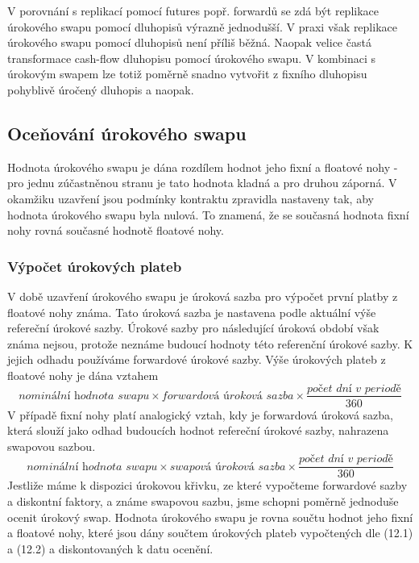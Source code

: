 \documentclass[a4paper]{book}
\begin{document}
V porovnání s replikací pomocí futures popř. forwardů se zdá být replikace úrokového swapu pomocí dluhopisů výrazně jednodušší. V praxi však replikace úrokového swapu pomocí dluhopisů není příliš běžná. Naopak velice častá transformace cash-flow dluhopisu pomocí úrokového swapu. V kombinaci s úrokovým swapem lze totiž poměrně snadno vytvořit z fixního dluhopisu pohyblivě úročený dluhopis a naopak.

\subsection{Oceňování úrokového swapu}

Hodnota úrokového swapu je dána rozdílem hodnot jeho fixní a floatové nohy - pro jednu zúčastněnou stranu je tato hodnota kladná a pro druhou záporná. V okamžiku uzavření jsou podmínky kontraktu zpravidla nastaveny tak, aby hodnota úrokového swapu byla nulová. To znamená, že se současná hodnota fixní nohy rovná současné hodnotě floatové nohy.

\subsubsection{Výpočet úrokových plateb}

V době uzavření úrokového swapu je úroková sazba pro výpočet první platby z floatové nohy známa. Tato úroková sazba je nastavena podle aktuální výše refereční úrokové sazby. Úrokové sazby pro následující úroková období však známa nejsou, protože neznáme budoucí hodnoty této referenční úrokové sazby. K jejich odhadu používáme forwardové úrokové sazby. Výše úrokových plateb z floatové nohy je dána vztahem
\begin{equation}
\textit{nomin\'{a}ln\'i hodnota swapu} \times \textit{forwardov\'{a} \'{u}rokov\'{a} sazba}  \times \frac{\textit{po\v{c}et dn\'{i} v period\v{e}}}{360}
\end{equation}
V případě fixní nohy platí analogický vztah, kdy je forwardová úroková sazba, která slouží jako odhad budoucích hodnot refereční úrokové sazby, nahrazena swapovou sazbou.
\begin{equation}
\textit{nomin\'{a}ln\'i hodnota swapu} \times \textit{swapov\'{a} \'{u}rokov\'{a} sazba}  \times \frac{\textit{po\v{c}et dn\'{i} v period\v{e}}}{360}
\end{equation}
Jestliže máme k dispozici úrokovou křivku, ze které vypočteme forwardové sazby a diskontní faktory, a známe swapovou sazbu, jsme schopni poměrně jednoduše ocenit úrokový swap. Hodnota úrokového swapu je rovna součtu hodnot jeho fixní a floatové nohy, které jsou dány součtem úrokových plateb vypočtených dle (12.1) a (12.2) a diskontovaných k datu ocenění.
\end{document}
